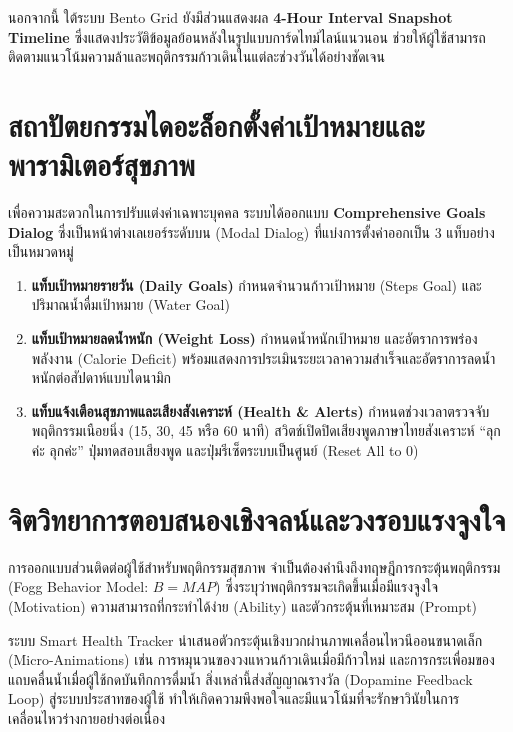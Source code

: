 นอกจากนี้ ใต้ระบบ Bento Grid ยังมีส่วนแสดงผล \textbf{4-Hour Interval Snapshot Timeline} ซึ่งแสดงประวัติข้อมูลย้อนหลังในรูปแบบการ์ดไทม์ไลน์แนวนอน ช่วยให้ผู้ใช้สามารถติดตามแนวโน้มความล้าและพฤติกรรมก้าวเดินในแต่ละช่วงวันได้อย่างชัดเจน

\section{สถาปัตยกรรมไดอะล็อกตั้งค่าเป้าหมายและพารามิเตอร์สุขภาพ}
เพื่อความสะดวกในการปรับแต่งค่าเฉพาะบุคคล ระบบได้ออกแบบ \textbf{Comprehensive Goals Dialog} ซึ่งเป็นหน้าต่างเลเยอร์ระดับบน (Modal Dialog) ที่แบ่งการตั้งค่าออกเป็น 3 แท็บอย่างเป็นหมวดหมู่
\begin{enumerate}
    \item \textbf{แท็บเป้าหมายรายวัน (Daily Goals)} กำหนดจำนวนก้าวเป้าหมาย (Steps Goal) และปริมาณน้ำดื่มเป้าหมาย (Water Goal)
    \item \textbf{แท็บเป้าหมายลดน้ำหนัก (Weight Loss)} กำหนดน้ำหนักเป้าหมาย และอัตราการพร่องพลังงาน (Calorie Deficit) พร้อมแสดงการประเมินระยะเวลาความสำเร็จและอัตราการลดน้ำหนักต่อสัปดาห์แบบไดนามิก
    \item \textbf{แท็บแจ้งเตือนสุขภาพและเสียงสังเคราะห์ (Health \& Alerts)} กำหนดช่วงเวลาตรวจจับพฤติกรรมเนือยนิ่ง (15, 30, 45 หรือ 60 นาที) สวิตช์เปิดปิดเสียงพูดภาษาไทยสังเคราะห์ ``ลุกค่ะ ลุกค่ะ'' ปุ่มทดสอบเสียงพูด และปุ่มรีเซ็ตระบบเป็นศูนย์ (Reset All to 0)
\end{enumerate}

\section{จิตวิทยาการตอบสนองเชิงจลน์และวงรอบแรงจูงใจ}
การออกแบบส่วนติดต่อผู้ใช้สำหรับพฤติกรรมสุขภาพ จำเป็นต้องคำนึงถึงทฤษฎีการกระตุ้นพฤติกรรม (Fogg Behavior Model: $B = MAP$) ซึ่งระบุว่าพฤติกรรมจะเกิดขึ้นเมื่อมีแรงจูงใจ (Motivation) ความสามารถที่กระทำได้ง่าย (Ability) และตัวกระตุ้นที่เหมาะสม (Prompt)

ระบบ Smart Health Tracker นำเสนอตัวกระตุ้นเชิงบวกผ่านภาพเคลื่อนไหวนีออนขนาดเล็ก (Micro-Animations) เช่น การหมุนวนของวงแหวนก้าวเดินเมื่อมีก้าวใหม่ และการกระเพื่อมของแถบคลื่นน้ำเมื่อผู้ใช้กดบันทึกการดื่มน้ำ สิ่งเหล่านี้ส่งสัญญาณรางวัล (Dopamine Feedback Loop) สู่ระบบประสาทของผู้ใช้ ทำให้เกิดความพึงพอใจและมีแนวโน้มที่จะรักษาวินัยในการเคลื่อนไหวร่างกายอย่างต่อเนื่อง

